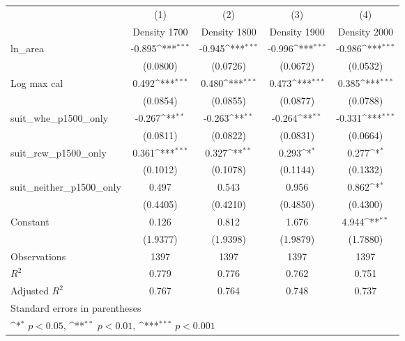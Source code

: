 {
\def\sym#1{\ifmmode^{#1}\else\(^{#1}\)\fi}
\begin{tabular}{l*{4}{c}}
\toprule
                    &\multicolumn{1}{c}{(1)}&\multicolumn{1}{c}{(2)}&\multicolumn{1}{c}{(3)}&\multicolumn{1}{c}{(4)}\\
                    &\multicolumn{1}{c}{Density 1700}&\multicolumn{1}{c}{Density 1800}&\multicolumn{1}{c}{Density 1900}&\multicolumn{1}{c}{Density 2000}\\
\midrule
ln\_area             &      -0.895\sym{***}&      -0.945\sym{***}&      -0.996\sym{***}&      -0.986\sym{***}\\
                    &    (0.0800)         &    (0.0726)         &    (0.0672)         &    (0.0532)         \\
\addlinespace
Log max cal         &       0.492\sym{***}&       0.480\sym{***}&       0.473\sym{***}&       0.385\sym{***}\\
                    &    (0.0854)         &    (0.0855)         &    (0.0877)         &    (0.0788)         \\
\addlinespace
suit\_whe\_p1500\_only &      -0.267\sym{**} &      -0.263\sym{**} &      -0.264\sym{**} &      -0.331\sym{***}\\
                    &    (0.0811)         &    (0.0822)         &    (0.0831)         &    (0.0664)         \\
\addlinespace
suit\_rcw\_p1500\_only &       0.361\sym{***}&       0.327\sym{**} &       0.293\sym{*}  &       0.277\sym{*}  \\
                    &    (0.1012)         &    (0.1078)         &    (0.1144)         &    (0.1332)         \\
\addlinespace
suit\_neither\_p1500\_only&       0.497         &       0.543         &       0.956         &       0.862\sym{*}  \\
                    &    (0.4405)         &    (0.4210)         &    (0.4850)         &    (0.4300)         \\
\addlinespace
Constant            &       0.126         &       0.812         &       1.676         &       4.944\sym{**} \\
                    &    (1.9377)         &    (1.9398)         &    (1.9879)         &    (1.7880)         \\
\midrule
Observations        &        1397         &        1397         &        1397         &        1397         \\
\(R^{2}\)           &       0.779         &       0.776         &       0.762         &       0.751         \\
Adjusted \(R^{2}\)  &       0.767         &       0.764         &       0.748         &       0.737         \\
\bottomrule
\multicolumn{5}{l}{\footnotesize Standard errors in parentheses}\\
\multicolumn{5}{l}{\footnotesize \sym{*} \(p<0.05\), \sym{**} \(p<0.01\), \sym{***} \(p<0.001\)}\\
\end{tabular}
}
